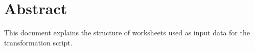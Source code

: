 \section*{Abstract}
This document explains the structure of worksheets used as input data
for the transformation script.